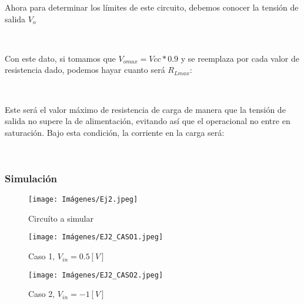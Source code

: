         Ahora para determinar los límites de este circuito, debemos conocer la tensión de salida $V_o$

        \begin{center}
            \\
        \end{center}

        Con este dato, si tomamos que $V_{omax} = Vcc*0.9$ y se reemplaza por cada valor de resistencia dado, podemos hayar cuanto será $R_{Lmax}$:\\

        \begin{center}
            \\
        \end{center}

        Este será el valor máximo de resistencia de carga de manera que la tensión de salida no supere la de alimentación, evitando así que el operacional no entre en saturación. Bajo esta condición, la corriente en la carga será:\\

        \begin{center}
            \\
        \end{center}
        
        \subsubsection{Simulación}

        \begin{figure}[H]
        	\centering
        	\texttt{[image: Imágenes/Ej2.jpeg]}
        	\caption{Circuíto a simular}
        \end{figure}

        \begin{figure}[H]
        	\centering
        	\texttt{[image: Imágenes/EJ2\_CASO1.jpeg]}
        	\caption{Caso 1, $V_{in} = 0.5 [V]$}
        \end{figure}

        \begin{figure}[H]
        	\centering
        	\texttt{[image: Imágenes/EJ2\_CASO2.jpeg]}
        	\caption{Caso 2, $V_{in} = -1 [V]$}
        \end{figure}

